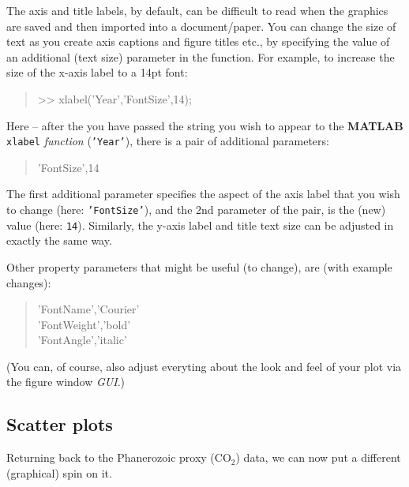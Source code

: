 \documentclass{tufte-book} %
\newenvironment{docspec}{\begin{quotation}\ttfamily\parskip0pt\parindent0pt\ignorespaces}{\end{quotation}}
\begin{document}
The axis and title labels, by default, can be difficult to read when the graphics are saved and then imported into a document/paper. You can change the size of text as you create axis captions and figure titles etc., by specifying the value of an additional (text size) parameter in the function. For example, to increase the size of the x-axis label to a 14pt font:

\begin{docspec}
>> xlabel('Year','FontSize',14);
\end{docspec}

Here -- after the you have passed the string you wish to appear to the \textbf{MATLAB} \texttt{xlabel} \textit{function} (\texttt{'Year'}), there is a pair of additional parameters:

\begin{docspec}
'FontSize',14
\end{docspec}

The first additional parameter specifies the aspect of the axis label that you wish to change (here: \texttt{'FontSize'}), and the 2nd parameter of the pair, is the (new) value (here: \texttt{14}). Similarly, the y-axis label and title text size can be adjusted in exactly the same way.

Other property parameters that might be useful (to change), are (with example changes):

\begin{docspec}
'FontName','Courier'\\
'FontWeight','bold'\\
'FontAngle','italic'
\end{docspec}

\noindent (You can, of course, also adjust everyting about the look and feel of your plot via the figure window \textit{GUI}.)


\subsection{Scatter plots}

Returning back to the Phanerozoic proxy (CO\(_{2}\)) data, we can now put a different (graphical) spin on it.
\end{document}
